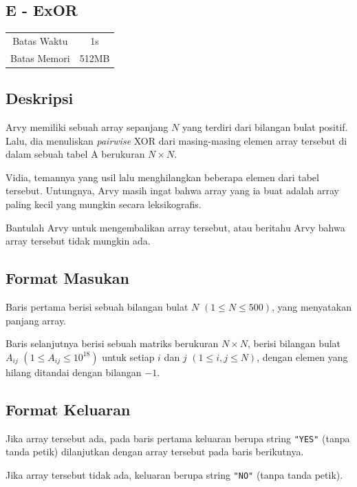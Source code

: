 \documentclass{article}
\begin{document}
\begin{center}
    \section*{E - ExOR} %

    \begin{tabular}{ | c c | }
        \hline
        Batas Waktu  & 1s \\    %
        Batas Memori & 512MB \\  %
        \hline
    \end{tabular}
\end{center}

\subsection*{Deskripsi}
Arvy memiliki sebuah array sepanjang $N$ yang terdiri dari bilangan bulat positif. Lalu, dia menuliskan \textit{pairwise} XOR dari masing-masing elemen array tersebut di dalam sebuah tabel A berukuran $N \times N$.

Vidia, temannya yang usil lalu menghilangkan beberapa elemen dari tabel tersebut. Untungnya, Arvy masih ingat bahwa array yang ia buat adalah array paling kecil yang mungkin secara leksikografis.

Bantulah Arvy untuk mengembalikan array tersebut, atau beritahu Arvy bahwa array tersebut tidak mungkin ada.

\subsection*{Format Masukan}
Baris pertama berisi sebuah bilangan bulat $N$ $(1 \leq N \leq 500)$, yang menyatakan panjang array.

Baris selanjutnya berisi sebuah matriks berukuran $N \times N$, berisi bilangan bulat $A_{ij}$ $(1 \leq A_{ij} \leq 10^{18})$ untuk setiap $i$ dan $j$ $(1 \leq i, j \leq N)$, dengan elemen yang hilang ditandai dengan bilangan $-1$. 

\subsection*{Format Keluaran}
Jika array tersebut ada, pada baris pertama keluaran berupa string \lstinline|"YES"| (tanpa tanda petik) dilanjutkan dengan array tersebut pada baris berikutnya.

Jika array tersebut tidak ada, keluaran berupa string \lstinline|"NO"| (tanpa tanda petik). 
\end{document}
